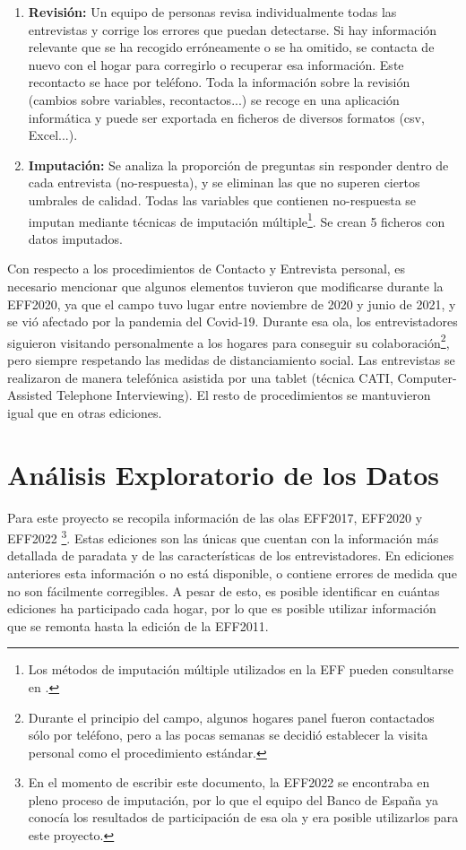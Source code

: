 \begin{enumerate}[noitemsep]
    \item \textbf{Revisión:} Un equipo de personas revisa individualmente todas las entrevistas y corrige los errores que puedan detectarse. Si hay información relevante que se ha recogido erróneamente o se ha omitido, se contacta de nuevo con el hogar para corregirlo o recuperar esa información. Este recontacto se hace por teléfono. Toda la información sobre la revisión (cambios sobre variables, recontactos...) se recoge en una aplicación informática y puede ser exportada en ficheros de diversos formatos (csv, Excel...).
    \item \textbf{Imputación:} Se analiza la proporción de preguntas sin responder dentro de cada entrevista (no-respuesta), y se eliminan las que no superen ciertos umbrales de calidad. Todas las variables que contienen no-respuesta se imputan mediante técnicas de imputación múltiple\footnote{Los métodos de imputación múltiple utilizados en la EFF pueden consultarse en \cite{barcelo2006imputation}.}. Se crean 5 ficheros con datos imputados.
\end{enumerate}

Con respecto a los procedimientos de Contacto y Entrevista personal, es necesario mencionar que algunos elementos tuvieron que modificarse durante la EFF2020, ya que el campo tuvo lugar entre noviembre de 2020 y junio de 2021, y se vió afectado por la pandemia del Covid-19. Durante esa ola, los entrevistadores siguieron visitando personalmente a los hogares para conseguir su colaboración\footnote{Durante el principio del campo, algunos hogares panel fueron contactados sólo por teléfono, pero a las pocas semanas se decidió establecer la visita personal como el procedimiento estándar.}, pero siempre respetando las medidas de distanciamiento social. Las entrevistas se realizaron de manera telefónica asistida por una tablet (técnica CATI, Computer-Assisted Telephone Interviewing). El resto de procedimientos se mantuvieron igual que en otras ediciones.

\section{Análisis Exploratorio de los Datos}
\label{section:exploring}

Para este proyecto se recopila información de las olas EFF2017, EFF2020 y EFF2022 \footnote{En el momento de escribir este documento, la EFF2022 se encontraba en pleno proceso de imputación, por lo que el equipo del Banco de España ya conocía los resultados de participación de esa ola y era posible utilizarlos para este proyecto.}. Estas ediciones son las únicas que cuentan con la información más detallada de paradata y de las características de los entrevistadores. En ediciones anteriores esta información o no está disponible, o contiene errores de medida que no son fácilmente corregibles. A pesar de esto, es posible identificar en cuántas ediciones ha participado cada hogar, por lo que es posible utilizar información que se remonta hasta la edición de la EFF2011.

